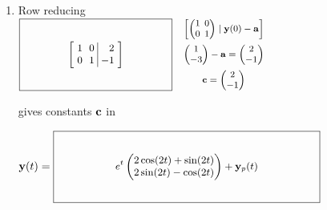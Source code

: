 \documentclass[12pt,letterpaper]{article}
\newcommand{\KeyBox}[3]{\vcenter{\hbox{$\boxed{\parbox[c][#2][c]{#1}{\centering\small\setlength{\arraycolsep}{3pt}\ensuremath{\displaystyle #3}}}$}}}
\newcommand{\KeySide}[2]{\quad\vcenter{\hbox{\parbox{#1}{\footnotesize\setlength{\arraycolsep}{2pt}\ensuremath{\begin{gathered}#2\end{gathered}}}}}}
\begin{document}
\begin{enumerate}
\begin{enumerate}
\par
$\vect{y}_p(t)=\KeyBox{3.2in}{0.80in}{\begin{pmatrix}-1\\-2\end{pmatrix}\cos(2t)+\begin{pmatrix}2\\0\end{pmatrix}\sin(2t)}\KeySide{2.4in}{\begin{pmatrix}-A&2I\\-2I&-A\end{pmatrix}\begin{pmatrix}\vect{a}\\\vect{b}\end{pmatrix}=\begin{pmatrix}1\\4\\0\\0\end{pmatrix}\\=\begin{pmatrix}-1&2&2&0\\-2&-1&0&2\\-2&0&-1&2\\0&-2&-2&-1\end{pmatrix}\begin{pmatrix}\vect{a}\\\vect{b}\end{pmatrix}\\\vect{a}=\begin{pmatrix}-1\\-2\end{pmatrix},\quad\vect{b}=\begin{pmatrix}2\\0\end{pmatrix}}$
\item Row reducing
$\KeyBox{1.8in}{0.80in}{\left[\begin{array}{rr|r}1&0&2\\0&1&-1\end{array}\right]}\KeySide{2.8in}{\left[\begin{pmatrix}1&0\\0&1\end{pmatrix}\mid\vect{y}(0)-\vect{a}\right]\\\begin{pmatrix}1\\-3\end{pmatrix}-\vect{a}=\begin{pmatrix}2\\-1\end{pmatrix}\\\vect{c}=\begin{pmatrix}2\\-1\end{pmatrix}}$
\par
gives constants $\mathbf{c}$ in
\par
$\vect{y}(t)=\KeyBox{3.2in}{0.80in}{e^t\begin{pmatrix}2\cos(2t)+\sin(2t)\\2\sin(2t)-\cos(2t)\end{pmatrix}+\vect{y}_p(t)}$
\end{enumerate}
\end{enumerate}
\end{document}
